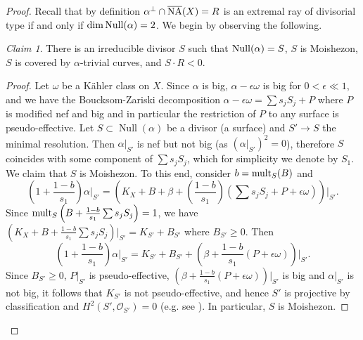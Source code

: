 \documentclass[12pt]{amsart}
\theoremstyle{plain}
\theoremstyle{remark}
\theoremstyle{definition}
\def\Null{\operatorname{Null}}
\newcommand{\<}{\leq}
\def\mcO{\mathcal{O}}
\def\mcO{\mathcal{O}}
\def\eps{\epsilon}
\def\dim{\operatorname{dim}}
\theoremstyle{definition}
\theoremstyle{definition}
\numberwithin{equation}{section}
\theoremstyle{remark}
\newtheorem{claim}[theorem]{Claim}
\begin{document}
\begin{proof} Recall that by definition $\alpha ^\perp \cap \overline{\rm NA}(X)=R$ is an extremal ray of divisorial type if and only if $\dim {\rm Null}(\alpha)=2$. 
We begin by observing the following.
\begin{claim}
    There is an irreducible divisor $S$ such that ${\rm Null}(\alpha)=S$, $S$ is Moishezon, $S$ is covered by $\alpha$-trivial curves, and $S\cdot R<0$.
\end{claim}
\begin{proof}
Let $\omega$ be a K\"ahler class on $X$. Since $\alpha$ is big, $\alpha-\eps\omega$ is big for $0<\epsilon \ll 1$, and we have the Boucksom-Zariski decomposition $\alpha -\epsilon \omega =\sum s_jS_j+P$ where $P$ is modified nef and big and in particular the restriction of $P$ to any surface is pseudo-effective. Let $S\subset\Null(\alpha)$ be a divisor (a surface) and $S'\to S$ the minimal resolution. Then $\alpha |_{S'}$ is nef but not big (as $(\alpha |_{S'})^2=0$), therefore $S$ coincides with some component of $\sum s_jS_j$, which for simplicity we denote by $S_1$.
    We claim that $S$ is Moishezon. To this end, consider $b={\rm mult}_{S}(B)$ and \[\left(1+\frac {1-b}{s_1}\right)\alpha \vert_{S'}=\left(K_X+B+\beta +\left(\frac {1-b}{s_1}\right)\left(\sum s_jS_j+P+\epsilon \omega\right)\right)\Big\vert_{S'}.\]
     Since ${\rm mult}_{S}\left(B+\frac {1-b}{s_1}\sum s_jS_j\right)=1$, we have $\left(K_X+B +\frac {1-b}{s_1}\sum s_jS_j\right)\big\vert_{S'}=K_{S'}+B_{S'}$ where $B_{S'}\geq 0$.
       Then 
    \begin{equation}\label{eqn:restriction-to-resolution}
         \left(1+\frac {1-b}{s_1}\right)\alpha |_{S'}=K_{S'}+B_{S'}+\left(\beta +\frac {1-b}{s_1}(P+\epsilon \omega)\right)\Big\vert_{S'}.
    \end{equation} 
    Since $B_{S'}\geq 0$, $P|_{S'}$ is pseudo-effective, $(\beta +\frac {1-b}{s_1}(P+\epsilon \omega))|_{S'}$ is big and $\alpha |_{S'}$ is not big, it follows that $K_{S'}$ is not pseudo-effective, and hence $S'$ is projective by classification and $H^2(S', \mcO_{S'})=0$ (e.g. see \cite[Lemma 2.40]{DH20}). In particular, $S$ is Moishezon. 
    

\end{proof}
\end{proof}
\end{document}
